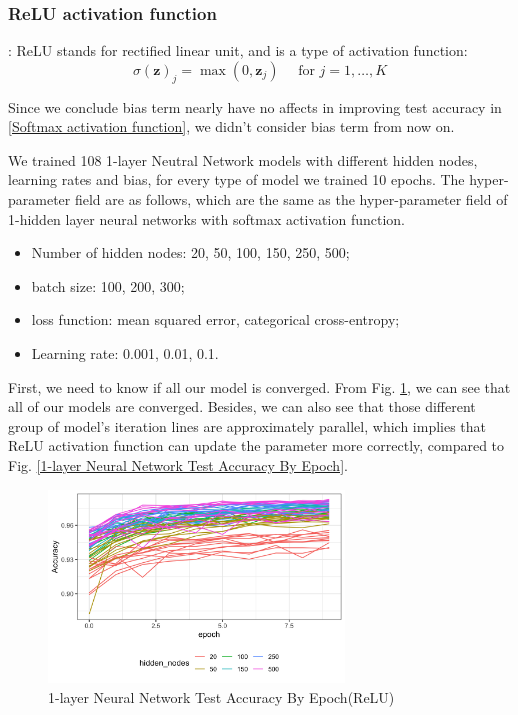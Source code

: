 \documentclass[8pt]{beamer}
\begin{document}
\subsubsection{ReLU activation function}
\begin{frame}[allowframebreaks]{\secname : \subsecname}{\subsubsecname}
ReLU stands for rectified linear unit, and is a type of activation function:
$$\sigma(\mathbf{z})_j=\max (0,\mathbf{z}_j)\quad \text { for } j=1, \ldots, K$$

Since we conclude bias term nearly have no affects in improving test accuracy in \ref{Softmax activation function}, we didn't consider bias term from now on. 

We trained 108 1-layer Neutral Network models with different hidden nodes, learning rates and bias, for every type of model we trained 10 epochs. The hyper-parameter field are as follows, which are the same as the hyper-parameter field of 1-hidden layer neural networks with softmax activation function.
\begin{itemize}
  \item Number of hidden nodes: 20, 50, 100, 150, 250, 500;
  \item batch size: 100, 200, 300;
  \item loss function: mean squared error, categorical cross-entropy;
  \item Learning rate: 0.001, 0.01, 0.1.
\end{itemize}

\framebreak
First, we need to know if all our model is converged. From Fig. \ref{1-layer Neural Network Test Accuracy By Epoch(ReLU)}, we can see that all of our models are converged. Besides, we can also see that those different group of model's iteration lines are approximately parallel, which implies that ReLU activation function can update the parameter more correctly, compared to Fig. \ref{1-layer Neural Network Test Accuracy By Epoch}.
\begin{figure}[htbp]
\centerline{\includegraphics[width=0.7\textwidth]{figure/91-layer Neural Network Test Accuracy By Epoch.png}}
\caption{1-layer Neural Network Test Accuracy By Epoch(ReLU)}
\label{1-layer Neural Network Test Accuracy By Epoch(ReLU)}
\vspace{-1.5em}
\end{figure}



\end{frame}
\end{document}
